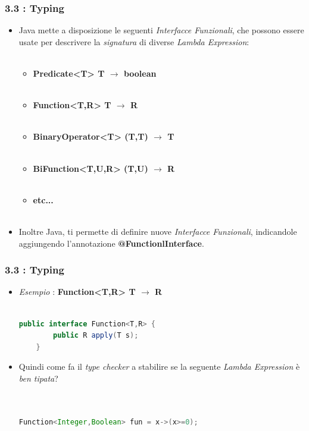 \documentclass{beamer}
\begin{document}
\begin{frame}
	\frametitle{\textbf{3.3 : Typing}}
	\begin{itemize}
		\item
			Java mette a disposizione le seguenti \textit{Interfacce Funzionali}, che possono essere usate per descrivere la \textit{signatura} di diverse \textit{Lambda Expression}:\\\
			\begin{itemize}
				\item
					\textbf{Predicate<T> \quad T $\rightarrow$ boolean}\\\
				\item
					\textbf{Function<T,R> \quad T $\rightarrow$ R}\\\
				\item
					\textbf{BinaryOperator<T> \quad (T,T) $\rightarrow$ T}\\\
				\item
					\textbf{BiFunction<T,U,R> \quad (T,U) $\rightarrow$ R}\\\
				\item
					\textbf{etc...}\\\
			\end{itemize}
		\item
			Inoltre Java, ti permette di definire nuove \textit{Interfacce Funzionali}, indicandole aggiungendo l'annotazione \textbf{@FunctionlInterface}.
	\end{itemize}
\end{frame}


\begin{frame}[fragile]
	\frametitle{\textbf{3.3 : Typing}}
	\begin{itemize}
		\item
			\textit{Esempio} : \textbf{Function<T,R> \quad T $\rightarrow$ R}\\\
\begin{lstlisting}[language=Java]
 	public interface Function<T,R> {
		public R apply(T s);
	}
\end{lstlisting}
		\item 
			Quindi come fa il \textit{type checker} a stabilire se la seguente \textit{Lambda Expression} è \textit{ben tipata}?\\\
\begin{lstlisting}[language=Java]

Function<Integer,Boolean> fun = x->(x>=0);

\end{lstlisting}
	\end{itemize}
\end{frame}
\end{document}
